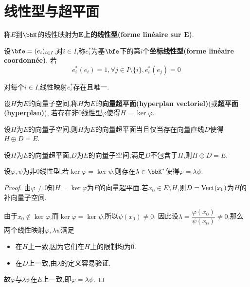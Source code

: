\section{线性型与超平面}

\begin{deff}
    称$E$到$\bbK$的线性映射为\textbf{$\boldsymbol{E}$上的线性型(forme linéaire sur $\boldsymbol{E}$)}.
\end{deff}

\begin{deff}
    设$\bfe = (e_i)_{i \in I}$,对$i \in I$,称$e_i^*$为基$\bfe$下的第$i$个\textbf{坐标线性型(forme linéaire coordonnée)},
    若\[ e_i^*(e_i) = 1, \forall j \in I \setminus \{ i \}, e_i^*(e_j) = 0 \]
\end{deff}

\begin{rqq}
    对每个$i \in I$,线性映射$e_i^*$存在且唯一.
\end{rqq}

\begin{deff}
    设$H$为$E$的向量子空间,称$H$为$E$的\textbf{向量超平面(hyperplan vectoriel)}(或\textbf{超平面(hyperplan)}),
    若存在非0线性型$\varphi$使得$H = \ker \varphi$.
\end{deff}

\begin{prop}
    设$H$为$E$的向量子空间,则$H$为$E$的向量超平面当且仅当存在向量直线$D$使得$H \oplus D = E$.
\end{prop}

\begin{cor}
    设$H$为$E$的向量超平面,$D$为$E$的向量子空间,满足$D$不包含于$H$,则$H \oplus D = E$.
\end{cor}

\begin{prop}
    设$\varphi, \psi$为非0线性型,若$\ker \varphi = \ker \psi$,则存在$\lambda \in \bbK^*$使得$\varphi = \lambda \psi$.
\end{prop}

\begin{proof}
    由$\varphi \neq 0$知$H = \ker \varphi$为$E$的向量超平面.若$x_0 \in E \setminus H$,则$D = \operatorname{Vect}(x_0)$为$H$的补向量子空间.

    由于$x_0 \notin \ker \varphi$,而$\ker \varphi = \ker \psi$,所以$\psi(x_0) \neq 0$.
    因此设$\lambda = \dfrac{\varphi(x_0)}{\psi(x_0)} \neq 0$,那么两个线性映射$\varphi, \lambda \psi$满足

    \begin{itemize}
        \item 在$H$上一致,因为它们在$H$上的限制均为0.
        \item 在$D$上一致,由$\lambda$的定义容易验证.
    \end{itemize}

    故$\varphi$与$\lambda \psi$在$E$上一致,即$\varphi = \lambda \psi$.
\end{proof}